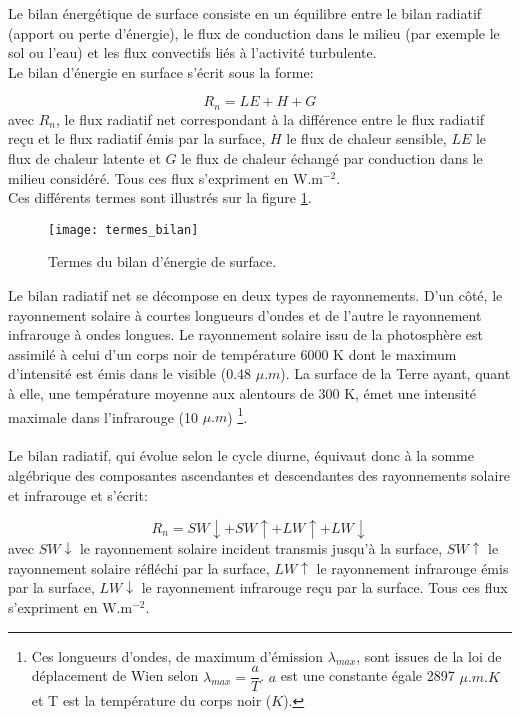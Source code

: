 \noindent Le bilan énergétique de surface consiste en un équilibre entre le bilan radiatif (apport ou perte d'énergie), le flux de conduction dans le milieu (par exemple le sol ou l'eau) et les flux convectifs liés à l'activité turbulente.\\

\noindent Le bilan d'énergie en surface s'écrit sous la forme: 

\begin{equation}
R_{n} = LE + H + G
\end{equation}
avec $R_{n}$, le flux radiatif net correspondant à la différence entre le flux radiatif reçu et le flux radiatif émis par la surface, $H$ le flux de chaleur sensible, $LE$ le flux de chaleur latente et $G$ le flux de chaleur échangé par conduction dans le milieu considéré. Tous ces flux s'expriment en W.m$^{-2}$. \\
\clearpage
\noindent Ces différents termes sont illustrés sur la figure \ref{termes_bilan}.\\
\begin{figure}[h!]
 \centerline{\texttt{[image: termes\_bilan]}}
 \caption{Termes du bilan d'énergie de surface.}
 \label{termes_bilan}
\end{figure}

Le bilan radiatif net se décompose en deux types de rayonnements. D'un côté, le rayonnement solaire à courtes longueurs d'ondes et de l'autre le rayonnement infrarouge à ondes longues. Le rayonnement solaire issu de la photosphère est assimilé à celui d'un corps noir de température 6000 K dont le maximum d'intensité est émis dans le visible (0.48 $\mu.m$). La surface de la Terre ayant, quant à elle, une température moyenne aux alentours de 300 K, émet une intensité maximale dans l'infrarouge (10 $\mu. m$) \footnote{Ces longueurs d'ondes, de maximum d'émission $\lambda_{max}$, sont issues de la loi de déplacement de Wien selon $\lambda_{max} = \dfrac{a}{T}$. $a$ est une constante égale 2897 $\mu.m.K$ et T est la température du corps noir ($K$).}. \\
~\\

\noindent Le bilan radiatif, qui évolue selon le cycle diurne, équivaut donc à la somme algébrique des composantes ascendantes et descendantes des rayonnements solaire et infrarouge et s'écrit:

\begin{equation}
R_{n} = SW\downarrow + SW\uparrow + LW\uparrow + LW\downarrow
\end{equation}
avec $SW\downarrow$ le rayonnement solaire incident transmis jusqu'à la surface, $SW\uparrow$ le rayonnement solaire réfléchi par la surface, $LW\uparrow$ le rayonnement infrarouge émis par la surface, $LW\downarrow$ le rayonnement infrarouge reçu par la surface. Tous ces flux s'expriment en W.m$^{-2}$.
\\

